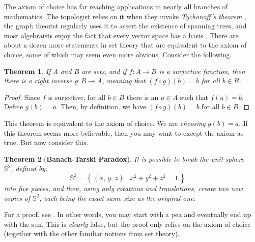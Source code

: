 \documentclass{article}
\newtheorem{theorem}{Theorem}[section]
\theoremstyle{definition}
\begin{document}
        The axiom of choice has far reaching applications in nearly all
        branches of mathematics. The topologist relies on it when they invoke
        \textit{Tychonoff's theorem} \cite[p.~234]{Munkres2000},
        the graph theorist regularly uses it to assert the existence of
        spanning trees, and most algebraists enjoy the fact that every
        vector space has a basis \cite[p.~518]{ArtinAlgebra2014}.
        There are about a dozen more statements in set theory that are
        equivalent to the axiom of choice, some of which may seem even
        more obvious. Consider the following.
        \begin{theorem}
            If $A$ and $B$ are sets, and if $f:A\rightarrow{B}$ is a
            surjective function, then there is a \textit{right inverse}
            $g:B\rightarrow{A}$, meaning that $(f\circ{g})(b)=b$ for all
            $b\in{B}$.
        \end{theorem}
        \begin{proof}
            Since $f$ is surjective, for all $b\in{B}$ there is an $a\in{A}$
            such that $f(a)=b$. Define $g(b)=a$. Then, by definition, we have
            $(f\circ{g})(b)=b$ for all $b\in{B}$.
        \end{proof}
        This theorem is equivalent to the axiom of choice. We are
        \textit{choosing} $g(b)=a$. If this theorem seems more believable,
        then you may want to except the axiom as true. But now consider this.
        \begin{theorem}[\textbf{Banach-Tarski Paradox}]
            It is possible to break the unit sphere $\mathbb{S}^{2}$,
            defined by:
            \begin{equation}
                \mathbb{S}^{2}
                =\left\{\,(x,\,y,\,z)\;\big|\;x^{2}+y^{2}+z^{2}=1\,\right\}
            \end{equation}
            into five pieces, and then, using only rotations and translations,
            create two new copies of $\mathbb{S}^{2}$, each being the exact
            same size as the original one.
        \end{theorem}
        For a proof, see \cite[p.~29]{WagonBanachTarski}.
        In other words, you may start with a pea and eventually end up with
        the sun. This is \textit{clearly}
        false, but the proof only relies on the axiom of choice
        (together with the other familiar notions from set theory).
        \par\hfill\par
\end{document}
